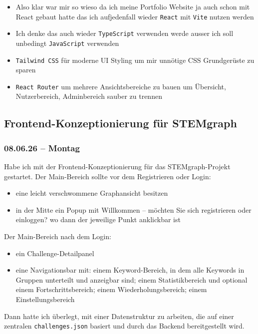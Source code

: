 \begin{itemize}[itemsep=2pt, topsep=4pt]
  \item Also klar war mir so wieso da ich meine Portfolio Website ja auch schon mit React gebaut hatte das ich aufjedenfall wieder \texttt{React} mit \texttt{Vite} nutzen werden
  \item Ich denke das auch wieder \texttt{TypeScript} verwenden werde ausser ich soll unbedingt \texttt{JavaScript} verwenden
  \item \texttt{Tailwind CSS} für moderne UI Styling um mir unnötige CSS Grundgerüste zu sparen
  \item \texttt{React Router} um mehrere Ansichtsbereiche zu bauen um Übersicht, Nutzerbereich, Adminbereich sauber zu trennen
\end{itemize}

\subsection{Frontend-Konzeptionierung für STEMgraph}
\subsubsection{08.06.26 -- Montag}

Habe ich mit der Frontend-Konzeptionierung für das STEMgraph-Projekt gestartet.
Der Main-Bereich sollte vor dem Registrieren oder Login:

\begin{itemize}[itemsep=2pt, topsep=4pt]
  \item eine leicht verschwommene Graphansicht besitzen
  \item in der Mitte ein Popup mit \glqq Willkommen -- möchten Sie sich registrieren
        oder einloggen?\grqq{} wo dann der jeweilige Punkt anklickbar ist
\end{itemize}

Der Main-Bereich nach dem Login:

\begin{itemize}
  \item ein Challenge-Detailpanel
  \item eine Navigationsbar mit:
        einem Keyword-Bereich, in dem alle Keywords in Gruppen unterteilt und anzeigbar sind;
        einem Statistikbereich und optional einem Fortschrittsbereich;
        einem Wiederholungsbereich;
        einem Einstellungsbereich
\end{itemize}
Dann hatte ich überlegt, mit einer Datenstruktur zu arbeiten, die auf einer zentralen
\texttt{challenges.json} basiert und durch das Backend bereitgestellt wird.

